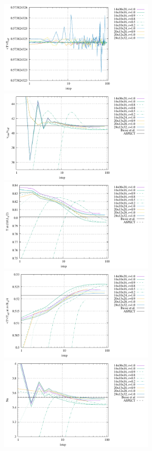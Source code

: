 \begin{center}
\includegraphics[width=7.5cm]{python_codes/fieldstone_20/results/Tavrg.pdf}\\
\includegraphics[width=7.5cm]{python_codes/fieldstone_20/results/vrms.pdf}
\includegraphics[width=7.5cm]{python_codes/fieldstone_20/results/Tmid.pdf}\\
\includegraphics[width=7.5cm]{python_codes/fieldstone_20/results/Tm.pdf}
\includegraphics[width=7.5cm]{python_codes/fieldstone_20/results/Nu.pdf}\\

\end{center}
